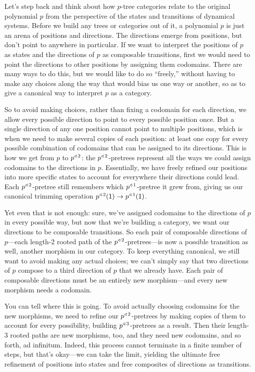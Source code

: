 \documentclass[Book-Poly]{subfiles}
\begin{document}
\begin{example}
Let's step back and think about how $p$-tree categories relate to the original polynomial $p$ from the perspective of the states and transitions of dynamical systems.
Before we build any trees or categories out of it, a polynomial $p$ is just an arena of positions and directions.
The directions emerge from positions, but don't point to anywhere in particular.
If we want to interpret the positions of $p$ as states and the directions of $p$ as composable transitions, first we would need to point the directions to other positions by assigning them codomains.
There are many ways to do this, but we would like to do so ``freely,'' without having to make any choices along the way that would bias us one way or another, so as to give a canonical way to interpret $p$ as a category.

So to avoid making choices, rather than fixing a codomain for each direction, we allow every possible direction to point to every possible position once.
But a single direction of any one position cannot point to multiple positions, which is when we need to make several copies of each position: at least one copy for every possible combination of codomains that can be assigned to its directions.
This is how we get from $p$ to $p^{\mathbin{\triangleleft}\,2}$: the $p^{\mathbin{\triangleleft}\,2}$-pretrees represent all the ways we could assign codomains to the directions in $p$.
Essentially, we have freely refined our positions into more specific states to account for everywhere their directions could lead.
Each $p^{\mathbin{\triangleleft}\,2}$-pretree still remembers which $p^{\mathbin{\triangleleft}\,1}$-pretree it grew from, giving us our canonical trimming operation $p^{\mathbin{\triangleleft}\,2}(\textsf{1})\to p^{\mathbin{\triangleleft}\,1}(\textsf{1})$.

Yet even that is not enough: sure, we've assigned codomains to the directions of $p$ in every possible way, but now that we're building a category, we want our directions to be composable transitions.
So each pair of composable directions of $p$—each length-$2$ rooted path of the $p^{\mathbin{\triangleleft}\,2}$-pretrees—is now a possible transition as well, another morphism in our category.
To keep everything canonical, we still want to avoid making any actual choices; we can't simply say that two directions of $p$ compose to a third direction of $p$ that we already have.
Each pair of composable directions must be an entirely new morphism---and every new morphism needs a codomain.

You can tell where this is going.
To avoid actually choosing codomains for the new morphisms, we need to refine our $p^{\mathbin{\triangleleft}\,2}$-pretrees by making copies of them to account for every possibility, building $p^{\mathbin{\triangleleft}\,3}$-pretrees as a result.
Then their length-$3$ rooted paths are new morphisms, too, and they need new codomains, and so forth, ad infinitum.
Indeed, this process cannot terminate in a finite number of steps, but that's okay---we can take the limit, yielding the ultimate free refinement of positions into states and free composites of directions as transitions.


\end{example}
\end{document}
